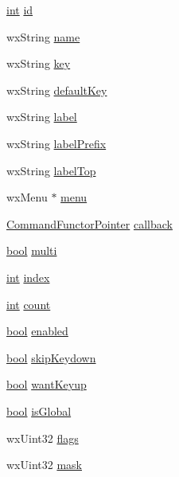 \begin{DoxyCompactItemize}
\item 
\hyperlink{xmltok_8h_a5a0d4a5641ce434f1d23533f2b2e6653}{int} \hyperlink{struct_command_list_entry_a6d157a570f95928cedd1a69ff5ba39ae}{id}
\item 
wx\+String \hyperlink{struct_command_list_entry_a306005d69b642db6dd086b67ffa7b36a}{name}
\item 
wx\+String \hyperlink{struct_command_list_entry_ac690c17d4e1e5a682f7b597801f516ee}{key}
\item 
wx\+String \hyperlink{struct_command_list_entry_a14e611973a6059356d55db81fffff13a}{default\+Key}
\item 
wx\+String \hyperlink{struct_command_list_entry_a62ce08e96eb023705953e0b1dfc7be33}{label}
\item 
wx\+String \hyperlink{struct_command_list_entry_a74ff5648445bb81eca0b2bcaa49489e6}{label\+Prefix}
\item 
wx\+String \hyperlink{struct_command_list_entry_a05ee028e2768d637b889608f9fd3a81c}{label\+Top}
\item 
wx\+Menu $\ast$ \hyperlink{struct_command_list_entry_a47f5b565dc30e1334ef24847919826a3}{menu}
\item 
\hyperlink{_command_manager_8h_a91ef9d090adbf621553a557ce3a8de32}{Command\+Functor\+Pointer} \hyperlink{struct_command_list_entry_afb5bd4547fe82baa05f9a34e63943925}{callback}
\item 
\hyperlink{mac_2config_2i386_2lib-src_2libsoxr_2soxr-config_8h_abb452686968e48b67397da5f97445f5b}{bool} \hyperlink{struct_command_list_entry_a3f3558e5787c5409bb5f2ed0039d3633}{multi}
\item 
\hyperlink{xmltok_8h_a5a0d4a5641ce434f1d23533f2b2e6653}{int} \hyperlink{struct_command_list_entry_a8f149791c63f259a86a70f099440c337}{index}
\item 
\hyperlink{xmltok_8h_a5a0d4a5641ce434f1d23533f2b2e6653}{int} \hyperlink{struct_command_list_entry_a4397e2a5f445fddba7f5150aab86d111}{count}
\item 
\hyperlink{mac_2config_2i386_2lib-src_2libsoxr_2soxr-config_8h_abb452686968e48b67397da5f97445f5b}{bool} \hyperlink{struct_command_list_entry_a984b0e5c3fbfb22365747c6f6cca5f60}{enabled}
\item 
\hyperlink{mac_2config_2i386_2lib-src_2libsoxr_2soxr-config_8h_abb452686968e48b67397da5f97445f5b}{bool} \hyperlink{struct_command_list_entry_ad033eb5adff81d38dbcfff33003ffda9}{skip\+Keydown}
\item 
\hyperlink{mac_2config_2i386_2lib-src_2libsoxr_2soxr-config_8h_abb452686968e48b67397da5f97445f5b}{bool} \hyperlink{struct_command_list_entry_a730ea593b6ad7f54424ab681ba3c87c1}{want\+Keyup}
\item 
\hyperlink{mac_2config_2i386_2lib-src_2libsoxr_2soxr-config_8h_abb452686968e48b67397da5f97445f5b}{bool} \hyperlink{struct_command_list_entry_a09a01397d7558faa2ee53df38424d8bb}{is\+Global}
\item 
wx\+Uint32 \hyperlink{struct_command_list_entry_a7e7201bbb8989220b607596085b96dbb}{flags}
\item 
wx\+Uint32 \hyperlink{struct_command_list_entry_a4d2702f79eb3dd92372b31bcfb84fa37}{mask}
\end{DoxyCompactItemize}


